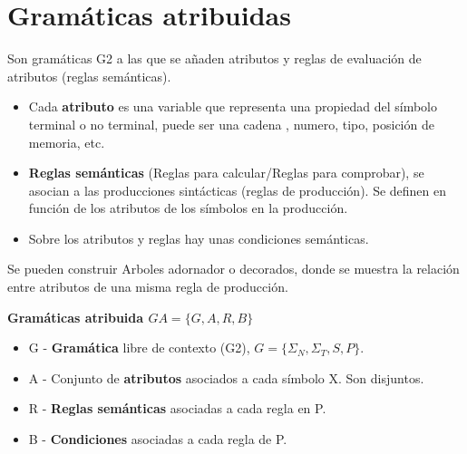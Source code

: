 \documentclass[12pt]{report} %
\begin{document}
\section{Gramáticas atribuidas}
Son gramáticas G2 a las que se añaden atributos y reglas de evaluación de atributos (reglas semánticas).
\begin{itemize}
  \item Cada \textbf{atributo} es una variable que representa una propiedad del símbolo terminal o no terminal, puede ser una cadena , numero, tipo, posición de memoria, etc.
  \item \textbf{Reglas semánticas} (Reglas para calcular/Reglas para comprobar), se asocian a las producciones sintácticas (reglas de producción). Se definen en función de los atributos de los símbolos en la producción.
  \item Sobre los atributos y reglas hay unas condiciones semánticas.
\end{itemize}

Se pueden construir Arboles adornador o decorados, donde se muestra la relación entre atributos de una misma regla de producción.

\textbf{Gramáticas atribuida $GA=\{G,A,R,B\}$}
\begin{itemize}
  \item G - \textbf{Gramática} libre de contexto (G2), $G = \{\Sigma_N, \Sigma_T, S, P\}$.
  \item A - Conjunto de \textbf{atributos} asociados a cada símbolo X. Son disjuntos.
  \item R - \textbf{Reglas semánticas} asociadas a cada regla en P.
  \item B - \textbf{Condiciones} asociadas a cada regla de P.
\end{itemize}
\end{document}
